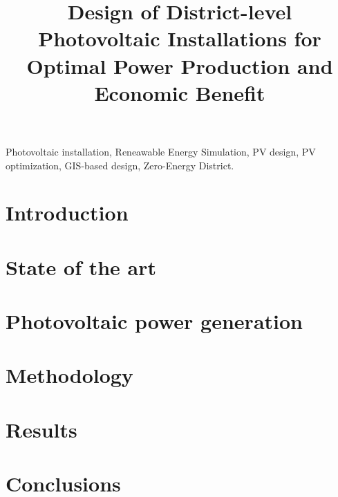 \documentclass[conference]{IEEEtran}
\begin{document}

\title{Design of District-level Photovoltaic Installations for Optimal Power Production and Economic Benefit}


\author{
 }

\maketitle

\begin{abstract}

\end{abstract}

\begin{IEEEkeywords}
	 Photovoltaic installation, Reneawable Energy Simulation, PV design, PV optimization, GIS-based design, Zero-Energy District.
\end{IEEEkeywords}


\section{Introduction}\label{sec:intro}


\section{State of the art}\label{sec:soa}


\section{Photovoltaic power generation}\label{sec:back_pv}


\section{Methodology}\label{sec:method}


\section{Results}\label{sec:results}


\section{Conclusions}\label{sec:concl}




\end{document}

